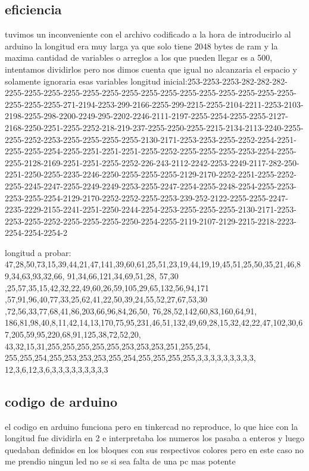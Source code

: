 \documentclass{article}
\begin{document}
\subsection{eficiencia} 
tuvimos un inconveniente con el archivo codificado a la hora de introducirlo al arduino la longitud era muy larga ya que solo tiene 2048 bytes de ram y la maxima cantidad de variables o arreglos a los que pueden llegar es a 500, intentamos dividirlos pero nos dimos cuenta que igual no alcanzaria el espacio y solamente ignoraria esas variables 
longitud inicial:253-2253-2253-282-282-282-2255-2255-2255-2255-2255-2255-2255-2255-2255-2255-2255-2255-2255-2255-2255-2255-2255-2255-271-2194-2253-299-2166-2255-299-2215-2255-2104-2211-2253-2103-2198-2255-298-2200-2249-295-2202-2246-2111-2197-2255-2254-2255-2255-2127-2168-2250-2251-2255-2252-218-219-237-2255-2250-2255-2215-2134-2113-2240-2255-2255-2252-2253-2255-2255-2255-2255-2130-2171-2253-2253-2255-2252-2254-2251-2255-2255-2254-2255-2251-2251-2251-2255-2252-2255-2255-2255-2253-2254-2255-2255-2128-2169-2251-2251-2255-2252-226-243-2112-2242-2253-2249-2117-282-250-2251-2250-2255-2235-2246-2250-2255-2255-2255-2129-2170-2252-2251-2255-2252-2255-2245-2247-2255-2249-2249-2253-2255-2247-2254-2255-2248-2254-2255-2253-2253-2255-2254-2129-2170-2252-2252-2255-2253-239-252-2122-2255-2255-2247-2235-2229-2155-2241-2251-2250-2244-2254-2253-2255-2255-2255-2130-2171-2253-2253-2255-2252-2255-2255-2255-2250-2254-2255-2119-2107-2129-2215-2218-2223-2254-2254-2254-2

longitud a probar:
47,28,50,73,15,39,44,21,47,141,39,60,61,25,51,23,19,44,19,19,45,51,25,50,35,21,46,89,34,63,93,32,66,
91,34,66,121,34,69,51,28,
57,30
,25,57,35,15,42,32,22,49,60,26,59,105,29,65,132,56,94,171
,57,91,96,40,77,33,25,62,41,22,50,39,24,55,52,27,67,53,30
,72,56,33,77,68,41,86,203,66,96,84,26,50,
76,28,52,142,60,83,160,64,91,
186,81,98,40,8,11,42,14,13,170,75,95,231,46,51,132,49,69,28,15,32,42,22,47,102,30,67,205,59,95,220,68,91,125,38,72,52,20,
43,32,15,31,255,255,255,255,255,253,253,253,251,255,254,
255,255,254,255,253,253,253,255,254,255,255,255,255,3,3,3,3,3,3,3,3,3,
12,3,6,12,3,6,3,3,3,3,3,3,3,3,3
\subsection{codigo de arduino}
el codigo en arduino funciona pero en tinkercad no reproduce, lo que hice con la longitud fue dividirla en 2 e interpretaba los numeros los pasaba a enteros y luego quedaban definidos en los bloques con sus respectivos colores pero en este caso no me prendio ningun led no se si sea falta de una pc mas potente
\end{document}
